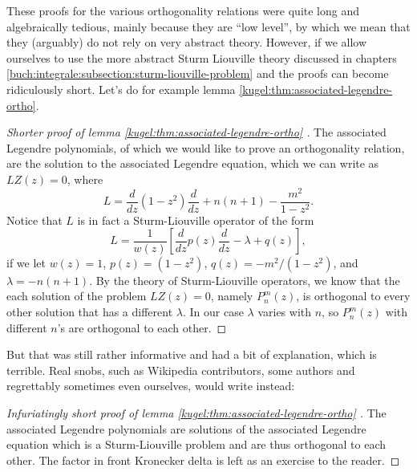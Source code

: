 These proofs for the various orthogonality relations were quite long and
algebraically tedious, mainly because they are ``low level'', by which we mean
that they (arguably) do not rely on very abstract theory. However, if we allow
ourselves to use the more abstract Sturm Liouville theory discussed in chapters
\ref{buch:integrale:subsection:sturm-liouville-problem} and  the proofs can become ridiculously
short. Let's do for example lemma \ref{kugel:thm:associated-legendre-ortho}.

\begin{proof}[
    Shorter proof of lemma \ref{kugel:thm:associated-legendre-ortho}
  ]
  The associated Legendre polynomials, of which we would like to prove an
  orthogonality relation, are the solution to the associated Legendre equation,
  which we can write as $LZ(z) = 0$, where
  \begin{equation*}
    L = \frac{d}{dz} (1 - z^2) \frac{d}{dz}
      + n(n+1) - \frac{m^2}{1 - z^2}.
  \end{equation*}
  Notice that $L$ is in fact a Sturm-Liouville operator of the form
  \begin{equation*}
    L = \frac{1}{w(z)} \left[
        \frac{d}{dz} p(z) \frac{d}{dz} - \lambda + q(z)
      \right],
  \end{equation*}
  if we let $w(z) = 1$, $p(z) = (1 - z^2 )$, $q(z) = -m^2 / (1 - z^2)$, and
  $\lambda = -n(n+1)$. By the theory of Sturm-Liouville operators, we know that
  the each solution of the problem $LZ(z) = 0$, namely $P^m_n(z)$, is orthogonal
  to every other solution that has a different $\lambda$. In our case $\lambda$
  varies with $n$, so $P^m_n(z)$ with different $n$'s are orthogonal to each
  other.
\end{proof}

But that was still rather informative and had a bit of explanation, which is
terrible. Real snobs, such as Wikipedia contributors, some authors and
regrettably sometimes even ourselves, would write instead:

\begin{proof}[
    Infuriatingly short proof of lemma \ref{kugel:thm:associated-legendre-ortho}
  ]
  The associated Legendre polynomials are solutions of the associated Legendre
  equation which is a Sturm-Liouville problem and are thus orthogonal to each
  other. The factor in front Kronecker delta is left as an exercise to the
  reader.
\end{proof}

